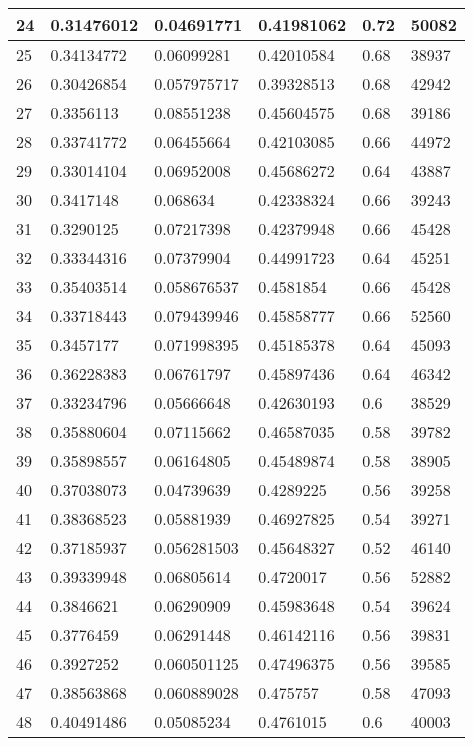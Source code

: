 \begin{longtable}{|l|l|l|l|l|l|}
24 & 0.31476012 & 0.04691771 & 0.41981062 & 0.72 & 50082 \\ \hline 
25 & 0.34134772 & 0.06099281 & 0.42010584 & 0.68 & 38937 \\ \hline 
26 & 0.30426854 & 0.057975717 & 0.39328513 & 0.68 & 42942 \\ \hline 
27 & 0.3356113 & 0.08551238 & 0.45604575 & 0.68 & 39186 \\ \hline 
28 & 0.33741772 & 0.06455664 & 0.42103085 & 0.66 & 44972 \\ \hline 
29 & 0.33014104 & 0.06952008 & 0.45686272 & 0.64 & 43887 \\ \hline 
30 & 0.3417148 & 0.068634 & 0.42338324 & 0.66 & 39243 \\ \hline 
31 & 0.3290125 & 0.07217398 & 0.42379948 & 0.66 & 45428 \\ \hline 
32 & 0.33344316 & 0.07379904 & 0.44991723 & 0.64 & 45251 \\ \hline 
33 & 0.35403514 & 0.058676537 & 0.4581854 & 0.66 & 45428 \\ \hline 
34 & 0.33718443 & 0.079439946 & 0.45858777 & 0.66 & 52560 \\ \hline 
35 & 0.3457177 & 0.071998395 & 0.45185378 & 0.64 & 45093 \\ \hline 
36 & 0.36228383 & 0.06761797 & 0.45897436 & 0.64 & 46342 \\ \hline 
37 & 0.33234796 & 0.05666648 & 0.42630193 & 0.6 & 38529 \\ \hline 
38 & 0.35880604 & 0.07115662 & 0.46587035 & 0.58 & 39782 \\ \hline 
39 & 0.35898557 & 0.06164805 & 0.45489874 & 0.58 & 38905 \\ \hline 
40 & 0.37038073 & 0.04739639 & 0.4289225 & 0.56 & 39258 \\ \hline 
41 & 0.38368523 & 0.05881939 & 0.46927825 & 0.54 & 39271 \\ \hline 
42 & 0.37185937 & 0.056281503 & 0.45648327 & 0.52 & 46140 \\ \hline 
43 & 0.39339948 & 0.06805614 & 0.4720017 & 0.56 & 52882 \\ \hline 
44 & 0.3846621 & 0.06290909 & 0.45983648 & 0.54 & 39624 \\ \hline 
45 & 0.3776459 & 0.06291448 & 0.46142116 & 0.56 & 39831 \\ \hline 
46 & 0.3927252 & 0.060501125 & 0.47496375 & 0.56 & 39585 \\ \hline 
47 & 0.38563868 & 0.060889028 & 0.475757 & 0.58 & 47093 \\ \hline 
48 & 0.40491486 & 0.05085234 & 0.4761015 & 0.6 & 40003 \\ \hline 

\end{longtable}

